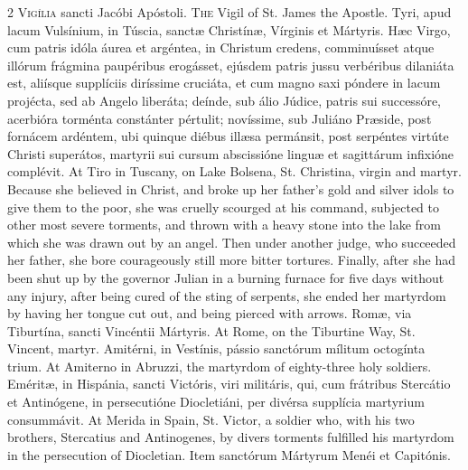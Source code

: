\begin{paracol}{2}
\lettrine[lines=1]{V}{igília} sancti Jacóbi Apóstoli.
\switchcolumn
{}
\lettrine[lines=1]{T}{he} Vigil of St. James the Apostle.
\switchcolumn*
{}
Tyri, apud lacum 
 Vulsínium, in Túscia, sanctæ Christínæ, Vírginis et Mártyris. Hæc 
 Virgo, cum patris idóla áurea et argéntea, in Christum credens, comminuísset 
 atque illórum frágmina paupéribus erogásset, ejúsdem patris jussu verbéribus 
 dilaniáta est, aliísque supplíciis diríssime cruciáta, et cum magno saxi 
 póndere in lacum projécta, sed ab Angelo liberáta; deínde, sub álio Júdice, 
 patris sui successóre, acerbióra torménta constánter pértulit; novíssime, 
 sub Juliáno Præside, post fornácem ardéntem, ubi quinque diébus illæsa 
 permánsit, post serpéntes virtúte Christi superátos, martyrii sui cursum 
 abscissióne linguæ et sagittárum infixióne complévit.
\switchcolumn
{}
At Tiro in Tuscany, on Lake Bolsena, 
 St. Christina, virgin and martyr. Because she believed in Christ, and 
 broke up her father's gold and silver idols to give them to the poor, she 
 was cruelly scourged at his command, subjected to other most severe 
 torments, and thrown with a heavy stone into the lake from which she was 
 drawn out by an angel. Then under another judge, who succeeded her 
 father, she bore courageously still more bitter tortures. Finally, 
 after she had been shut up by the governor Julian in a burning furnace for 
 five days without any injury, after being cured of the sting of serpents, 
 she ended her martyrdom by having her tongue cut out, and being pierced with 
 arrows.
\switchcolumn*
{}
Romæ, via Tiburtína, 
 sancti Vincéntii Mártyris.
\switchcolumn
{}
At Rome, on the Tiburtine Way, St. 
 Vincent, martyr.
\switchcolumn*
{}
Amitérni, in Vestínis, 
 pássio sanctórum mílitum octogínta trium.
\switchcolumn
{}
At Amiterno in Abruzzi, the 
 martyrdom of eighty-three holy soldiers.
\switchcolumn*
{}
Eméritæ, in Hispánia, 
 sancti Victóris, viri militáris, qui, cum frátribus Stercátio et Antinógene, 
 in persecutióne Diocletiáni, per divérsa supplícia martyrium consummávit.
\switchcolumn
{}
At Merida in Spain, St. Victor, a 
 soldier who, with his two brothers, Stercatius and Antinogenes, by divers 
 torments fulfilled his martyrdom in the persecution of Diocletian.
\switchcolumn*
{}
Item sanctórum Mártyrum 
 Menéi et Capitónis.

\end{paracol}
